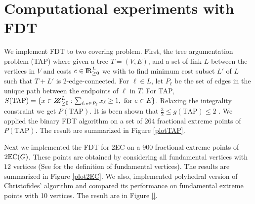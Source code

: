 \section{Computational experiments with FDT}\label{experiment}
We implement FDT to two covering problem. First, the tree argumentation problem (TAP) where given a tree $T=(V,E)$, and a set of link $L$ between the vertices in $V$ and costs $c\in {\rm I\!R}^{L}_{\geq 0}$ we with to find minimum cost subset $L'$ of $L$ such that $T+L'$ is 2-edge-connected. For $\ell\in L$, let $P_\ell$ be the set of edges in the unique path between the endpoints of $\ell$ in $T$. For TAP, $S(\mbox{TAP})=\{x\in \bbbz^{L}_{\geq 0}: \sum_{\ell: e\in P_\ell}x_\ell \geq 1, \mbox{ for $e\in E$}\}$. Relaxing the integrality constraint we get $P(\mbox{TAP})$. It is been shown that $\frac{3}{2}\leq g({\mbox{TAP}})\leq 2$ \cite{fj,32gap}. We applied the binary FDT algorithm on a set of 264 fractional extreme points of $P(\mbox{TAP})$. The result are summarized in Figure \ref{plotTAP}. 

Next we implemented the FDT for 2EC on a 900 fractional extreme points of $\operatorname{2EC}(G)$. These points are obtained by considering all fundamental vertices with $12$ vertices (See \cite{CV} for the definition of fundamental vertices). The results are summarized in Figure \ref{plot2EC}. We also, implemented polyhedral version of Christofides' algorithm \cite{Wolsey1980} and compared its performance on fundamental extreme points with 10 vertices. The result are in Figure \ref{}.